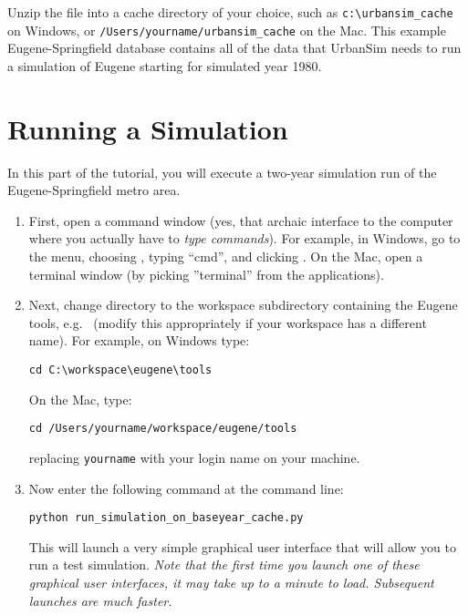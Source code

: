 \documentclass{howto}
\begin{document}
Unzip the file into a cache
directory of your choice, such as \verb|c:\urbansim_cache| on Windows, or 
\verb|/Users/yourname/urbansim_cache| on the Mac. This example 
Eugene-Springfield database contains all of the data that UrbanSim needs to 
run a simulation of Eugene starting for simulated year 1980.

\section*{Running a Simulation}

In this part of the tutorial, you will execute a two-year simulation run of the
Eugene-Springfield metro area.

\begin{enumerate}

\item First, open a command window (yes, that archaic interface to the
computer where you actually have to \emph{type commands}). For
example, in Windows, go to the  menu, choosing
, typing ``cmd'', and clicking .  On the Mac,
open a terminal window (by picking ''terminal'' from the applications).

\item Next, change directory to the workspace subdirectory containing
the Eugene tools, e.g.\
(modify this appropriately if your workspace has a different name).
For example, on Windows type:

\begin{verbatim}
cd C:\workspace\eugene\tools
\end{verbatim}

On the Mac, type:
\begin{verbatim}
cd /Users/yourname/workspace/eugene/tools
\end{verbatim}
replacing {\tt yourname} with your login name on your machine.

\item Now enter the following command at the command line:

\begin{verbatim}
python run_simulation_on_baseyear_cache.py
\end{verbatim}

This will launch a very simple graphical user interface that will allow you to
run a test simulation.  \emph{Note that the first time you launch one of these
graphical user interfaces, it may take up to a minute to load.  Subsequent
launches are much faster.}


\end{enumerate}
\end{document}
